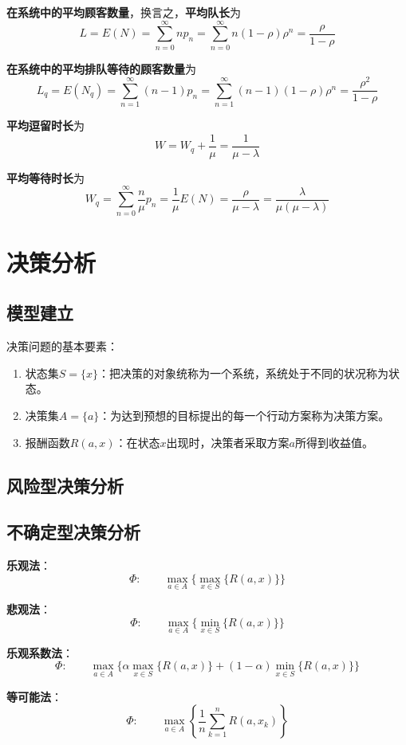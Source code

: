 \documentclass[lang = cn, scheme = chinese, thmcnt = section]{elegantbook}
\begin{document}
\textbf{在系统中的平均顾客数量}，换言之，\textbf{平均队长}为
$$
L
=E(N)
=\sum_{n=0}^{\infty}np_n
=\sum_{n=0}^{\infty}n(1-\rho)\rho^n
=\frac{\rho}{1-\rho}
$$

\textbf{在系统中的平均排队等待的顾客数量}为
$$
L_q
=E(N_q)
=\sum_{n=1}^{\infty}(n-1)p_n
=\sum_{n=1}^{\infty}(n-1)(1-\rho)\rho^n
=\frac{\rho^2}{1-\rho}
$$

\textbf{平均逗留时长}为
$$
W=W_q+\frac{1}{\mu}
=\frac{1}{\mu-\lambda}
$$

\textbf{平均等待时长}为
$$
W_q
=\sum_{n=0}^{\infty}\frac{n}{\mu}p_n
=\frac{1}{\mu}E(N)
=\frac{\rho}{\mu-\lambda}
=\frac{\lambda}{\mu(\mu-\lambda)}
$$

\chapter{决策分析}

\section{模型建立}

决策问题的基本要素：
\begin{enumerate}
	\item 状态集$S=\{ x \}$：把决策的对象统称为一个系统，系统处于不同的状况称为状态。
	\item 决策集$A=\{ a \}$：为达到预想的目标提出的每一个行动方案称为决策方案。
	\item 报酬函数$R(a,x)$：在状态$x$出现时，决策者采取方案$a$所得到收益值。
\end{enumerate}

\section{风险型决策分析}

\section{不确定型决策分析}

\textbf{乐观法}：%
$$
\Phi:\qquad\max_{a\in A}\{ \max_{x\in S}\{ R(a,x) \} \}
$$

\textbf{悲观法}：%
$$
\Phi:\qquad\max_{a\in A}\{ \min_{x\in S}\{ R(a,x) \} \}
$$

\textbf{乐观系数法}：%
$$
\Phi:\qquad\max_{a\in A}\{ \alpha\max_{x\in S}\{ R(a,x) \}+(1-\alpha)\min_{x\in S}\{ R(a,x) \} \}
$$

\textbf{等可能法}：%
$$
\Phi:\qquad\max_{a\in A}\left\{ \frac{1}{n}\sum_{k=1}^{n}R(a,x_k) \right\}
$$
\end{document}

